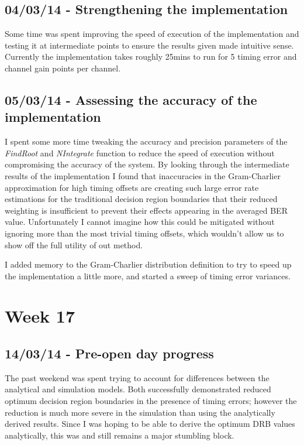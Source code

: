 \subsection{04/03/14 - Strengthening the implementation}

Some time was spent improving the speed of execution of the
implementation and testing it at intermediate points to ensure the
results given made intuitive sense. Currently the implementation takes
roughly 25mins to run for 5 timing error and channel gain points per
channel.

\subsection{05/03/14 - Assessing the accuracy of the implementation}

I spent some more time tweaking the accuracy and precision parameters of
the \emph{FindRoot} and \emph{NIntegrate} function to reduce the speed
of execution without compromising the accuracy of the system. By looking
through the intermediate results of the implementation I found that
inaccuracies in the Gram-Charlier approximation for high timing offsets
are creating such large error rate estimations for the traditional
decision region boundaries that their reduced weighting is insufficient
to prevent their effects appearing in the averaged BER value.
Unfortunately I cannot imagine how this could be mitigated without
ignoring more than the most trivial timing offsets, which wouldn't allow
us to show off the full utility of out method.

I added memory to the Gram-Charlier distribution definition to try to
speed up the implementation a little more, and started a sweep of timing
error variances.

\section{Week 17}

\subsection{14/03/14 - Pre-open day progress}

The past weekend was spent trying to account for differences between the
analytical and simulation models. Both successfully demonstrated reduced
optimum decision region boundaries in the presence of timing errors;
however the reduction is much more severe in the simulation than using
the analytically derived results. Since I was hoping to be able to
derive the optimum DRB values analytically, this was and still remains a
major stumbling block.


